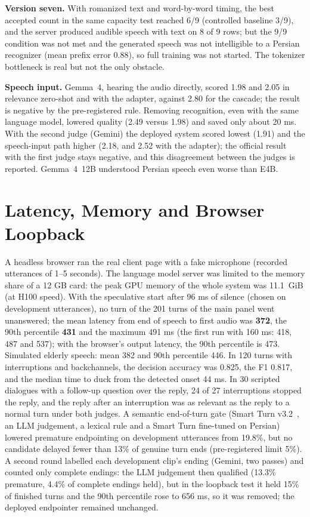 
\textbf{Version seven.} With romanized text and word-by-word timing, the best
accepted count in the same capacity test reached 6/9 (controlled baseline 3/9),
and the server produced audible speech with text on 8 of 9 rows; but the 9/9
condition was not met and the generated speech was not intelligible to a Persian
recognizer (mean prefix error 0.88), so full training was not started. The
tokenizer bottleneck is real but not the only obstacle.

\textbf{Speech input.} Gemma~4, hearing the audio directly, scored 1.98 and 2.05
in relevance zero-shot and with the adapter, against 2.80 for the cascade; the
result is negative by the pre-registered rule. Removing recognition, even with the
same language model, lowered quality (2.49 versus 1.98) and saved only about 20 ms.
With the second judge (Gemini) the deployed system scored lowest (1.91) and the
speech-input path higher (2.18, and 2.52 with the adapter); the official result
with the first judge stays negative, and this disagreement between the judges is
reported. Gemma~4~12B understood Persian speech even worse than E4B.

\section{Latency, Memory and Browser Loopback}
\label{sec:res-unmet}

A headless browser ran the real client page with a fake microphone (recorded
utterances of 1--5 seconds). The language model server was limited to the memory
share of a 12 GB card: the peak GPU memory of the whole system was 11.1~GiB (at
H100 speed). With the speculative start after 96 ms of silence (chosen on
development utterances), no turn of the 201 turns of the main panel went
unanswered; the mean latency from end of speech to first audio was
\textbf{372}, the 90th percentile \textbf{431} and the maximum 491 ms (the first
run with 160 ms: 418, 487 and 537); with the browser's output latency, the 90th
percentile is 473. Simulated elderly speech: mean 382 and 90th percentile 446. In
120 turns with interruptions and backchannels, the decision accuracy was 0.825,
the F1 0.817, and the median time to duck from the detected onset 44 ms. In 30
scripted dialogues with a follow-up question over the reply, 24 of 27
interruptions stopped the reply, and the reply after an interruption was as
relevant as the reply to a normal turn under both judges. A semantic end-of-turn
gate (Smart Turn v3.2~\cite{smartturn2025}, an LLM judgement, a lexical rule and a
Smart Turn fine-tuned on Persian) lowered premature endpointing on development
utterances from 19.8\%, but no candidate delayed fewer than 13\% of genuine turn
ends (pre-registered limit 5\%). A second round labelled each development
clip's ending (Gemini, two passes) and counted only complete endings: the LLM
judgement then qualified (13.3\% premature, 4.4\% of complete endings held), but
in the loopback test it held 15\% of finished turns and the 90th percentile rose
to 656 ms, so it was removed; the deployed endpointer remained unchanged.

